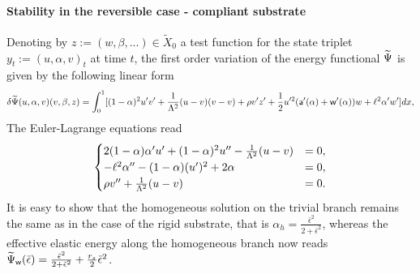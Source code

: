  \paragraph{Stability in the reversible case - compliant substrate}



Denoting by $z:=(w, \beta, ...)\in \widetilde{X}_0$ a test function for the state triplet  $y_t:=(u, \alpha, v)_t$ at time $t$, the first order variation of the energy functional $\widetilde\Psi$ is given by the following linear form 
\begin{equation}
\delta \widetilde\Psi(u, \alpha, v)(v,\beta,z)=\int_0^1 [(1-\alpha)^2u'v'+\frac{1}{\Lambda^2} (u- v) (v- v)+\rho v'z'+\frac{1}{2}u'^2 (\mathsf{a}'(\alpha)+\mathsf{w}'(\alpha))w+\ell^2\alpha'w' ]dx,\label{firstvar}
\end{equation}
The Euler-Lagrange equations read
\begin{eqnarray}
\label{modeld_el_1}
\begin{cases}
  2(1-\alpha)\alpha' u' +(1-\alpha)^2 u'' -  \frac{1}{\Lambda^2}(u-v) &= 0, \\
  -\ell^2\alpha'' - (1-\alpha)( u')^2 + 2\alpha   &= 0,\\
    \rho  v''  +  \frac{1}{\Lambda^2}(u-v) &= 0. \\
\end{cases}
\label{auto2}
\end{eqnarray}
It is easy to show that the homogeneous solution on the trivial branch remains the same as in the case of the rigid substrate, that is $\alpha_h = \frac{\bar{\epsilon}^2}{2 + \bar{\epsilon}^2}\label{eq:homo11}$, whereas the effective elastic energy along the homogeneous branch now reads $\widetilde\Psi_{\mathsf{w}}(\bar{\epsilon}) = \frac{\bar{\epsilon}^2}{2 + \bar{\epsilon}^2} + \frac{r_s}{2}\bar{\epsilon}^2$. 


